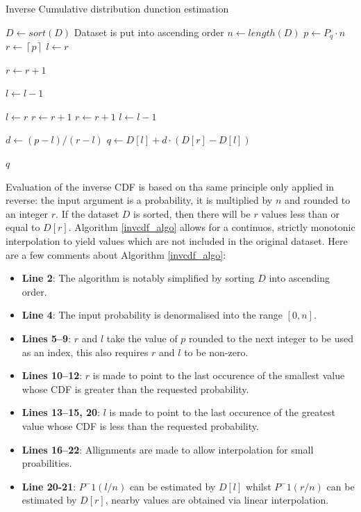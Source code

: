 \documentclass[10pt,final]{siamltex}
\begin{document}
\begin{algorithm}
  \caption{Inverse Cumulative distribution dunction estimation}
  \label{invcdf_algo}
  \begin{algorithmic}[1]
    \State $D \gets sort(D)$
    \Comment Dataset is put into ascending order
    \State $n \gets length(D)$
    \State $p \gets P_q \cdot n$
    \State $r \gets  \left \lceil{p}\right \rceil$
    \EndIf
    \State $l \gets r$

    \State $ r \gets r + 1$
    \EndWhile

    \State $l \gets l - 1$
    \EndWhile

    \State $l \gets r$
    \State $r \gets r+1$
    \State $r \gets r + 1$
    \EndWhile
    \Else
    \State $ l \gets l - 1$
    \EndIf

    \State $d \gets (p-l)/(r-l) $
    \State $q \gets D[l] + d \cdot (D[r]-D[l])$

    \State \Return $q$
    \EndFunction
  \end{algorithmic}
\end{algorithm}

Evaluation of the inverse CDF is based on tha same principle only applied in reverse: the input argument is a probability, it is multiplied by $n$ and rounded to an integer $r$. If the dataset $D$ is sorted, then there will be $r$ values less than or equal to $D[r]$. Algorithm \ref{invcdf_algo} allows for a continuos, strictly monotonic interpolation to yield values which are not included in the original dataset.
Here are a few comments about Algorithm \ref{invcdf_algo}:
\begin{itemize}
  \item \textbf{Line 2}: The algorithm is notably simplified by sorting $D$ into ascending order.
  \item \textbf{Line 4}: The input probability is denormalised into the range $[0, n]$.
  \item \textbf{Lines 5--9}: $r$ and $l$ take the value of $p$ rounded to the next integer to be used as an index, this also requires $r$ and $l$ to be non-zero.
  \item \textbf{Lines 10--12}: $r$ is made to point to the last occurence of the smallest value whose CDF is greater than the requested probability.
  \item \textbf{Lines 13--15, 20}: $l$ is made to point to the last occurence of the greatest value whose CDF is less than the requested probability.
  \item \textbf{Lines 16--22}: Allignments are made to allow interpolation for small proabilities.
  \item \textbf{Line 20-21}: $P^-1(l/n)$ can be estimated by $D[l]$ whilst $P^-1(r/n)$ can be estimated by $D[r]$, nearby values are obtained via linear interpolation.
\end{itemize}
%
\end{document}
